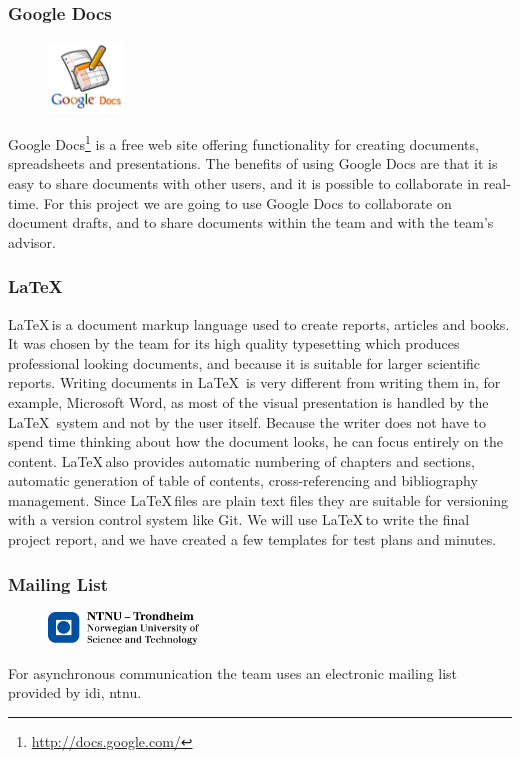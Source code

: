 \subsubsection{Google Docs}
\begin{figure}
	\vspace{-20pt}
	\includegraphics[width=2cm]{./planning/img/google_docs_logo}
	\vspace{-20pt}
\end{figure}
Google Docs\footnote{\url{http://docs.google.com/}} is a free web site offering
functionality for creating documents, spreadsheets and presentations.
The benefits of using Google Docs are that it is easy to share documents with other users, and
it is possible to collaborate in real-time. For this project we are going to use Google Docs
to collaborate on document drafts, and to share documents within the team and
with the team's advisor.

\subsubsection{\LaTeX}
\LaTeX \,is a document \gls{markup language} used to
create reports, articles and books. It was chosen by the team for its 
high quality typesetting which produces professional looking documents, and 
because it is suitable for larger scientific reports.\cite{NotSoShorGuideToLatex} 
Writing documents in \LaTeX \ is very different from writing them in, for example,
Microsoft Word, as most of the visual presentation is handled by the \LaTeX \ system 
and not by the user itself. Because the writer does not have to spend time
thinking about how the document looks, he can focus entirely on the content.
\LaTeX \,also provides automatic numbering of chapters and sections,
automatic generation of table of contents, cross-referencing and bibliography
management. Since \LaTeX \,files are plain text files they are suitable for versioning 
with a \gls{version control system} like Git. We will use \LaTeX \,to write the final project 
report, and we have created a few templates for test plans and minutes.

\subsubsection{Mailing List}
\begin{figure}
	\vspace{-20pt}
	\includegraphics[width=4cm]{./planning/img/ntnu_logo}
	\vspace{-20pt}
\end{figure}
For asynchronous communication the team uses an electronic mailing list
provided by \Gls{idi}, \Gls{ntnu}.

